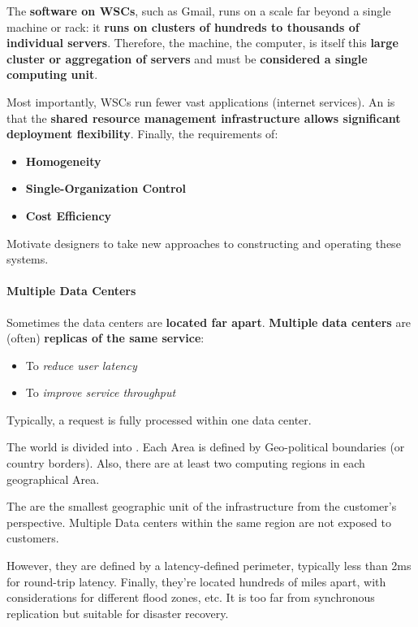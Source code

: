 \noindent
The \textbf{software on WSCs}, such as Gmail, runs on a scale far beyond a single machine or rack: it \textbf{runs on clusters of hundreds to thousands of individual servers}. Therefore, the machine, the computer, is itself this \textbf{large cluster or aggregation of servers} and must be \textbf{considered a single computing unit}.

\highspace
Most importantly, WSCs run fewer vast applications (internet services). An  is that the \textbf{shared resource management infrastructure allows significant deployment flexibility}. Finally, the requirements of:
\begin{itemize}
    \item \textbf{Homogeneity}
    \item \textbf{Single-Organization Control}
    \item \textbf{Cost Efficiency}
\end{itemize}
Motivate designers to take new approaches to constructing and operating these systems.

\newpage

\paragraph{Multiple Data Centers}

\noindent
Sometimes the data centers are \textbf{located far apart}. \textbf{Multiple data centers} are (often) \textbf{replicas of the same service}:
\begin{itemize}
    \item To \emph{reduce user latency}
    \item To \emph{improve service throughput}
\end{itemize}
Typically, a request is fully processed within one data center.

\highspace
The world is divided into . Each Area is defined by Geo-political boundaries (or country borders). Also, there are at least two computing regions in each geographical Area.

\highspace
The  are the smallest geographic unit of the infrastructure from the customer's perspective. Multiple Data centers within the same region are not exposed to customers.

However, they are defined by a latency-defined perimeter, typically less than 2ms for round-trip latency.
Finally, they're located hundreds of miles apart, with considerations for different flood zones, etc. It is too far from synchronous replication but suitable for disaster recovery.

